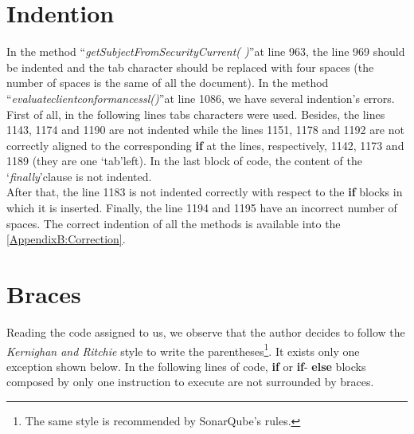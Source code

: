 \documentclass[\mainpath/main]{subfiles}
\begin{document}
\section{Indention}
\label{CodeInspectionChecklist:Indention}
In the method \textquotedblleft \textit{getSubjectFromSecurityCurrent( )}\textquotedblright at line 963, the line 969 should be indented and the tab character should be replaced with four spaces (the number of spaces is the same of all the document).
In the method \textquotedblleft \textit{evaluate\textunderscore client\textunderscore conformance\textunderscore ssl(\textellipsis)}\textquotedblright at line 1086, we have several indention's errors.\\
First of all, in the following lines tabs characters were used.
Besides, the lines 1143, 1174 and 1190 are not indented while the lines 1151, 1178 and 1192 are not correctly aligned to the corresponding \textbf{\color{javapurple} if} at the lines, respectively, 1142, 1173 and 1189 (they are one \textquoteleft tab\textquoteright left).
In the last block of code, the content of the \textquoteleft \textit{finally}\textquoteright clause is not indented.\\
After that, the line 1183 is not indented correctly with respect to the \textbf{\color{javapurple} if} blocks in which it is inserted.
Finally, the line 1194 and 1195 have an incorrect number of spaces.
The correct indention of all the methods is available into the \autoref{AppendixB:Correction}.

\section{Braces}
\label{CodeInspectionChecklist:Braces}
Reading the code assigned to us, we observe that the author decides to follow the \textit{Kernighan and Ritchie} style to write the parentheses\footnote{The same style is recommended by SonarQube's rules.}. It exists only one exception shown below.
In the following lines of code, \textbf{\color{javapurple} if} or \textbf{\color{javapurple} if}-\textbf{\color{javapurple} else} blocks composed by only one instruction to execute are not surrounded by braces.
\end{document}

